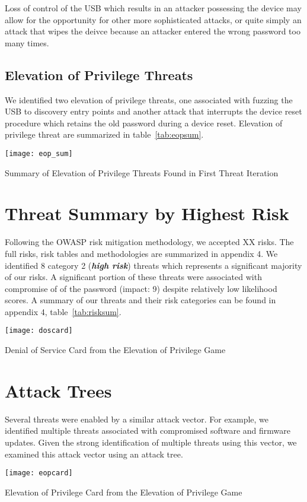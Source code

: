 Loss of control of the USB which results in an attacker possessing the device
may allow for the opportunity for other more sophisticated attacks, or quite
simply an attack that wipes the deivce because an attacker entered the wrong
password too many times.





\subsection{Elevation of Privilege Threats}
We identified two elevation of privilege threats, one associated with fuzzing the USB to discovery entry points and another attack that interrupts the device reset procedure which retains the old password during a device reset.  Elevation of privilege threat are summarized in table~\ref{tab:eopsum}.


\begin{table*}[ht]
    \centering
    \texttt{[image: eop\_sum]}
    \caption{Summary of Elevation of Privilege Threats Found in First Threat Iteration}
    \label{tab:eopsum}
\end{table*}



\section{Threat Summary by Highest Risk}
Following the  OWASP risk mitigation methodology, we accepted XX  risks.  The full risks, risk tables and methodologies are summarized in appendix 4. We identified 8 category 2 (\emph{\textbf{high risk}}) threats which represents a significant majority of our risks.  A significant portion of these threats were associated with compromise of of the password (impact: 9) despite relatively low likelihood scores.  A summary of our threats and their risk categories can be found in appendix 4, table~\ref{tab:risksum}.

\begin{marginfigure}%
\centering
  \texttt{[image: doscard]}
  \caption{Denial of Service Card from the Elevation of Privilege Game}
  \label{fig:doscard}
\end{marginfigure}


\section{Attack Trees}
Several threats were enabled by a similar attack vector.  For example, we identified multiple threats associated with compromised software and firmware updates.  Given the strong identification of multiple threats using this vector, we examined this attack vector using an attack tree.


\begin{marginfigure}%
\centering
  \texttt{[image: eopcard]}
  \caption{Elevation of Privilege Card from the Elevation of Privilege Game}
  \label{fig:eopcard}
\end{marginfigure}

